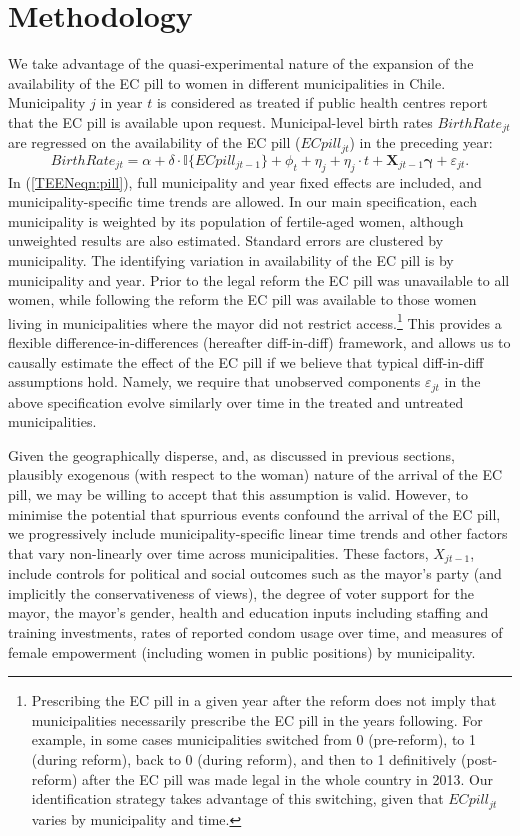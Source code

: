 \section{Methodology}
\label{TEENscn:ID}
We take advantage of the quasi-experimental nature of the expansion of the 
availability of the EC pill to women in different municipalities in Chile.
Municipality $j$ in year $t$ is considered as treated if public health centres
report that the EC pill is available upon request.  Municipal-level birth
rates $BirthRate_{jt}$ are regressed on the availability of the EC pill
($ECpill_{jt}$) in the preceding year:
\begin{equation}
 \label{TEENeqn:pill}
BirthRate_{jt} = \alpha + \delta\cdot \mathbb{I}\{ECpill_{jt-1}\} + \phi_t +
  \eta_j + \eta_j\cdot t + \bm{X}_{jt-1}\bm{\gamma} + \varepsilon_{jt}.
\end{equation}
In (\ref{TEENeqn:pill}), full municipality and year fixed effects are included,
and municipality-specific time trends are allowed.  In our main specification,
each municipality is weighted by its population of fertile-aged women, although
unweighted results are also estimated. Standard errors are clustered by
municipality.  The identifying variation in availability of the EC pill is by
municipality and year.  Prior to the legal reform the EC pill was unavailable to
all women, while following the reform the EC pill was available to those women
living in municipalities where the mayor did not restrict access.\footnote{%
Prescribing the EC pill in a given year after the reform does not imply that
municipalities necessarily prescribe the EC pill in the years following.  For
example, in some cases municipalities switched from 0 (pre-reform), to 1 (during
reform), back to 0 (during reform), and then to 1 definitively (post-reform)
after the EC pill was made legal in the whole country in 2013. Our identification
strategy takes advantage of this switching, given that $ECpill_{jt}$ varies by
municipality and time.}  This provides a flexible difference-in-differences
(hereafter diff-in-diff) framework, and allows us to causally estimate the effect
of the EC pill if we believe that typical diff-in-diff assumptions hold.  Namely,
we require that unobserved components $\varepsilon_{jt}$ in the above
specification evolve similarly over time in the treated and untreated
municipalities.

Given the geographically disperse, and, as discussed in previous sections,
plausibly exogenous (with respect to the woman) nature of the arrival of the 
EC pill, we may be willing to accept that this assumption is valid.  However,
to minimise the potential that spurrious events confound the arrival of the EC
pill, we progressively include municipality-specific linear time trends and other
factors that vary non-linearly over time across municipalities. These factors,
$X_{jt-1}$, include controls for political and social outcomes such as the
mayor's party (and implicitly the conservativeness of views), the degree of voter
support for the mayor, the mayor's gender, health and education inputs including
staffing and training investments, rates of reported condom usage over time, and
measures of female empowerment (including women in public positions)
by municipality.

